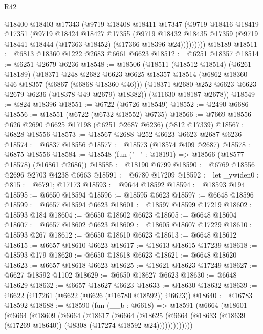 \begin{lexlean}{R42}
\begin{coremodule}
{          @18400
          @18403
          @17343
          (@9719
            @18408
            @18411
            @17347
            (@9719
              @18416
              @18419
              @17351
              (@9719
                @18424
                @18427
                @17355
                (@9719
                  @18432
                  @18435
                  @17359
                  (@9719 @18441 @18444 (@17363 @18452) (@17366 @18396 @24)))))))))
    @18189
@18511 := @6813 @18360 @1222 @2683 @6661 @6623
@18512 := @6251 @18357
@18514 := @6251 @2679 @6236
@18548 := @18506
    (@18511
      (@18512 @18514)
      (@6261 @18189)
      (@18371
        @248
        @2682
        @6623
        @6625
        @18357
        @18514
        (@6862 @18360 @46 @18357 (@6867 (@6868 @18360 @46)))
        (@18371 @2680 @252 @6623 @6623 @2679 @6236 (@18378 @49 @2679) @18382))
      (@11630 @18187 @2678))
@18549 := @824 @18396
@18551 := @6722 (@6726 @18549)
@18552 := @2490 @6686
@18556 := @18551 (@6722 (@6732 @18552) @6735)
@18566 := @7669 @18556 @626 @2690 @6625 @17198 (@6251 @2687 @6236) (@812 @17339)
@18567 := @6828 @18556
@18573 := @18567 @2688 @252 @6623 @6623 @2687 @6236
@18574 := @6837 @18556
@18577 := @18573 (@18574 @409 @2687)
@18578 := @6875 @18556
@18584 := @18548 (fun ("_" : @18191) => @18566 (@18577 @18578) (@16861 @2686))
@18585 := @18190 @6799
@18590 := @6769 @18556 @2696 @2703 @4238 @6663
@18591 := @6780 @17209
@18592 := let _ywiden0 : @815 := @6791; @17173
@18593 := @9644 @18592
@18594 := @18593 @194
@18595 := @6650 @18594
@18596 := @18595 @6623
@18597 := @6648 @18596
@18599 := @6657 @18594 @6623
@18601 := @18597 @18599 @17219
@18602 := @18593 @184
@18604 := @6650 @18602 @6623
@18605 := @6648 @18604
@18607 := @6657 @18602 @6623
@18609 := @18605 @18607 @17229
@18610 := @18593 @267
@18612 := @6650 @18610 @6623
@18613 := @6648 @18612
@18615 := @6657 @18610 @6623
@18617 := @18613 @18615 @17239
@18618 := @18593 @179
@18620 := @6650 @18618 @6623
@18621 := @6648 @18620
@18623 := @6657 @18618 @6623
@18625 := @18621 @18623 @17249
@18627 := @6627 @18592 @1102
@18629 := @6650 @18627 @6623
@18630 := @6648 @18629
@18632 := @6657 @18627 @6623
@18633 := @18630 @18632
@18639 := @6622 (@17261 (@6622 (@6626 (@16780 @18592)) @6623))
@18640 := @16783 @18592
@18688 := @18590
    (fun (__b : @6618) =>
    @18591
      (@6664
        (@18601
          (@6664
            (@18609
              (@6664
                (@18617
                  (@6664
                    (@18625
                      (@6664 (@18633 (@18639 (@17269 @18640)) (@8308 (@17274 @18592 @24)))))))))))))
}
\end{coremodule}
\end{lexlean}
